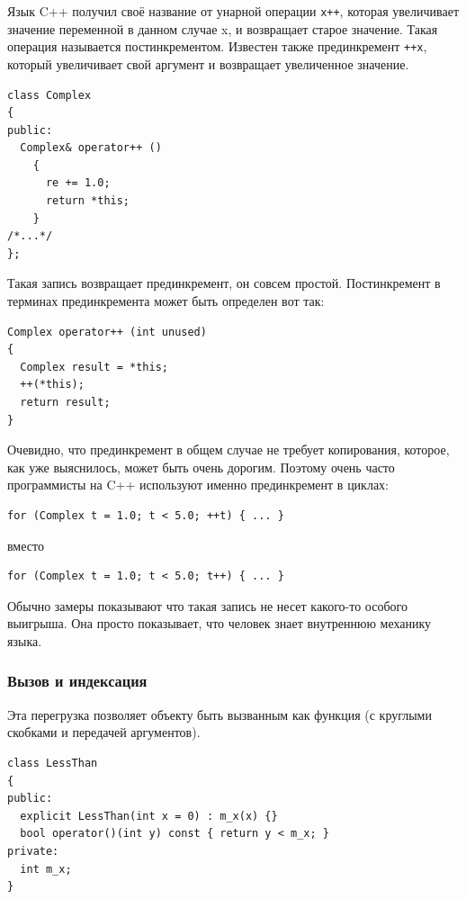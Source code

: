 \documentclass[a4paper,12pt,oneside]{article}
\begin{document}
Язык C++ получил своё название от унарной операции \lstinline!x++!, которая увеличивает значение переменной в данном случае x, и возвращает старое значение. Такая операция называется постинкрементом. Известен также прединкремент \lstinline!++x!, который увеличивает свой аргумент и возвращает увеличенное значение.

\begin{lstlisting}
class Complex
{
public:
  Complex& operator++ ()
    {
      re += 1.0;
      return *this;      
    }
/*...*/
};
\end{lstlisting}

Такая запись возвращает прединкремент, он совсем простой. Постинкремент в терминах прединкремента может быть определен вот так:

\begin{lstlisting}
Complex operator++ (int unused)
{
  Complex result = *this;
  ++(*this);
  return result;
} 
\end{lstlisting}

Очевидно, что прединкремент в общем случае не требует копирования, которое, как уже выяснилось, может быть очень дорогим. Поэтому очень часто программисты на C++ используют именно прединкремент в циклах:

\begin{lstlisting}
for (Complex t = 1.0; t < 5.0; ++t) { ... }
\end{lstlisting}

вместо

\begin{lstlisting}
for (Complex t = 1.0; t < 5.0; t++) { ... }
\end{lstlisting}

Обычно замеры показывают что такая запись не несет какого-то особого выигрыша. Она просто показывает, что человек знает внутреннюю механику языка.

\subsubsection{Вызов и индексация}\label{BracketOverloading}

Эта перегрузка позволяет объекту быть вызванным как функция (с круглыми скобками и передачей аргументов).

\begin{lstlisting}
class LessThan
{
public:
  explicit LessThan(int x = 0) : m_x(x) {}
  bool operator()(int y) const { return y < m_x; }
private:
  int m_x;
}
\end{lstlisting}
\end{document}
